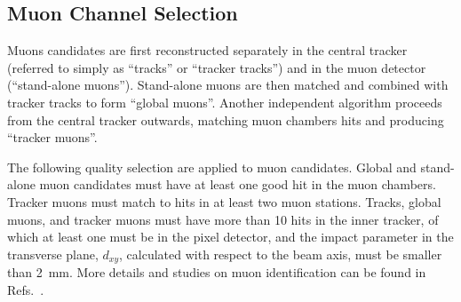 \subsection{Muon Channel Selection}
\label{sec:muonid}

Muons candidates are first reconstructed separately in the central tracker (referred to simply as ``tracks'' or ``tracker tracks'')
and in the muon detector (``stand-alone muons''). Stand-alone muons are then matched and combined with tracker
tracks to form ``global muons''. Another independent algorithm proceeds from the central tracker outwards, matching
muon chambers hits and producing ``tracker muons''.

The following quality selection are applied to muon candidates.
Global and stand-alone muon candidates must have at least one good hit in the muon chambers.
Tracker muons must match to hits in at least two muon stations.
Tracks, global muons, and tracker muons must have more than 10 hits in the inner tracker, 
of which at least one must be in the pixel detector, and the impact parameter in the 
transverse plane, $d_{xy}$, calculated with respect to the beam axis, 
must be smaller than 2~mm.
More details and studies on muon identification can be found in Refs.~\cite{MUONPAS,MuonPerf}.

